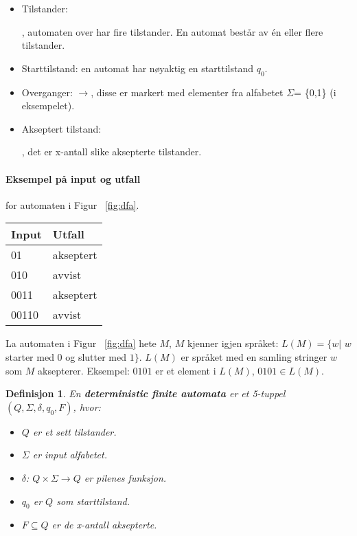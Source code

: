 \documentclass[11pt,a4paper]{article}
\newcommand\DrawCircleIns[2]{%
circle ({#2*cos(180/#1)})
}
\begin{document}
\begin{itemize}
\item{Tilstander: } 
, automaten over har fire tilstander. En automat består av én eller flere tilstander.
\item{Starttilstand: en automat har nøyaktig en starttilstand $q_0$.}
\item{Overganger: $\longrightarrow$, disse er markert med elementer fra alfabetet $\Sigma$= \{0,1\} (i eksempelet).}
\item{Akseptert tilstand: , det er x-antall slike aksepterte tilstander.}
\end{itemize}

\paragraph{Eksempel på input og utfall} for automaten i Figur ~\ref{fig:dfa}.
\begin{center}
\begin{tabular}{ l l }
Input & Utfall\\
\hline
01 & akseptert\\
010 & avvist\\
0011 & akseptert\\
00110 & avvist\\
\end{tabular}
\end{center}

La automaten i Figur ~\ref{fig:dfa} hete $M$, $M$ kjenner igjen språket: $L(M) = \{w |$  $w$ starter med $0$ og slutter med $1\}$. $L(M)$ er språket med en samling stringer $w$ som $M$ aksepterer. Eksempel: $0101$ er et element i $L(M)$, $0101 \in L(M)$.

\theoremstyle{mytheoremstyle}
\newtheorem{dfa}{Definisjon}[section]
\begin{dfa}
En \textbf{deterministic finite automata} er et 5-tuppel $(Q, \Sigma, \delta, q_0, F)$, hvor:
\begin{itemize}
\item{$Q$ er et sett tilstander.}
\item{$\Sigma$ er input alfabetet.}
\item{$\delta$: $Q  \times \Sigma \rightarrow Q$ er pilenes funksjon.}
\item{$q_0$ er $Q$ som starttilstand.}
\item{$F \subseteq Q$ er de x-antall aksepterte.}
\end{itemize}
\end{dfa}
\end{document}
